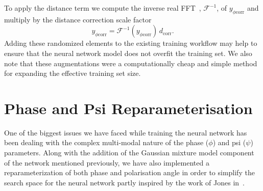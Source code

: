 %
%
To apply the distance term we  
compute the inverse real \ac{FFT}~\cite{Cooley1965AnAF}, $\mathcal{F}^{-1}$, 
of $y_{\phi \textrm{corr}}$ and 
multiply by the distance correction scale factor
%
\begin{equation}
    y_{\phi \textrm{corr}} = \mathcal{F}^{-1}(y_{\phi \textrm{corr}})\, d_{\textrm{corr}}. 
\end{equation}
%
Adding these randomized elements to the existing training workflow may   
help to ensure that the neural network model does not 
overfit the training set. We also note that these augmentations 
were a computationally cheap and simple 
method for expanding the effective training set size.

\section{Phase and Psi Reparameterisation }\label{sec:phipsi_repar}

One of the biggest issues we have faced while training the neural network has 
been dealing with the complex 
multi-modal nature of the phase ($\phi$) and psi ($\psi$) parameters. 
Along with the addition of the Gaussian mixture model component of the network 
mentioned previously, we have also implemented a reparameterization of both phase and 
polarisation angle in order to simplify the search space for the neural 
network partly inspired by the work of Jones in~\cite{10.1093/mnras/stv1584}.

